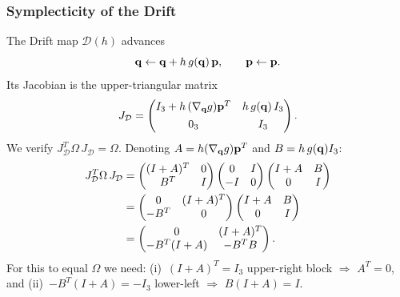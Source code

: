 \subsubsection{Symplecticity of the Drift}
\label{sec:drift_symplectic}

The Drift map $\mathcal{D}(h)$ advances
\begin{equation}
  \mathbf{q} \leftarrow \mathbf{q} + h\,g(\mathbf{q})\,\mathbf{p},
  \qquad
  \mathbf{p} \leftarrow \mathbf{p}.
  \label{eq:drift_map}
\end{equation}
Its Jacobian is the upper-triangular matrix
\begin{equation}
  J_{\mathcal{D}} =
  \begin{pmatrix}
    I_3 + h\,(\nabla_{\mathbf{q}} g)\mathbf{p}^T & h\,g(\mathbf{q})\,I_3 \\[4pt]
    0_3 & I_3
  \end{pmatrix}.
  \label{eq:drift_jacobian}
\end{equation}
We verify $J_{\mathcal{D}}^T \Omega\, J_{\mathcal{D}} = \Omega$.
Denoting $A = h(\nabla_{\mathbf{q}} g)\mathbf{p}^T$ and $B = h\,g(\mathbf{q})I_3$:
\begin{align}
  J_{\mathcal{D}}^T \Omega\, J_{\mathcal{D}}
  &= \begin{pmatrix} (I+A)^T & 0 \\ B^T & I \end{pmatrix}
     \begin{pmatrix} 0 & I \\ -I & 0 \end{pmatrix}
     \begin{pmatrix} I+A & B \\ 0 & I \end{pmatrix}
     \notag \\
  &= \begin{pmatrix} 0 & (I+A)^T \\ -B^T & 0 \end{pmatrix}
     \begin{pmatrix} I+A & B \\ 0 & I \end{pmatrix}
     \notag \\
  &= \begin{pmatrix}
       0 & (I+A)^T \\
       -B^T(I+A) & -B^T B
     \end{pmatrix}.
  \label{eq:drift_product}
\end{align}
For this to equal $\Omega$ we need:
(i)~$(I+A)^T = I_3$ upper-right block $\Rightarrow$ $A^T = 0$, and
(ii)~$-B^T(I+A) = -I_3$ lower-left $\Rightarrow$ $B(I+A) = I$.

